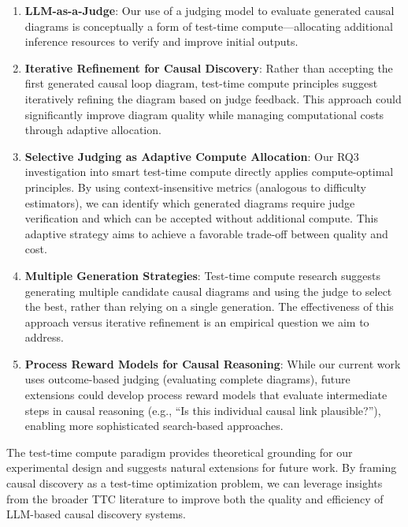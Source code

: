 \begin{enumerate}
    \item \textbf{LLM-as-a-Judge}: Our use of a judging model to evaluate generated causal diagrams is conceptually a form of test-time compute—allocating additional inference resources to verify and improve initial outputs.
    
    \item \textbf{Iterative Refinement for Causal Discovery}: Rather than accepting the first generated causal loop diagram, test-time compute principles suggest iteratively refining the diagram based on judge feedback. This approach could significantly improve diagram quality while managing computational costs through adaptive allocation.
    
    \item \textbf{Selective Judging as Adaptive Compute Allocation}: Our RQ3 investigation into smart test-time compute directly applies compute-optimal principles. By using context-insensitive metrics (analogous to difficulty estimators), we can identify which generated diagrams require judge verification and which can be accepted without additional compute. This adaptive strategy aims to achieve a favorable trade-off between quality and cost.
    
    \item \textbf{Multiple Generation Strategies}: Test-time compute research suggests generating multiple candidate causal diagrams and using the judge to select the best, rather than relying on a single generation. The effectiveness of this approach versus iterative refinement is an empirical question we aim to address.
    
    \item \textbf{Process Reward Models for Causal Reasoning}: While our current work uses outcome-based judging (evaluating complete diagrams), future extensions could develop process reward models that evaluate intermediate steps in causal reasoning (e.g., ``Is this individual causal link plausible?''), enabling more sophisticated search-based approaches.
\end{enumerate}

The test-time compute paradigm provides theoretical grounding for our experimental design and suggests natural extensions for future work. By framing causal discovery as a test-time optimization problem, we can leverage insights from the broader TTC literature to improve both the quality and efficiency of LLM-based causal discovery systems.

